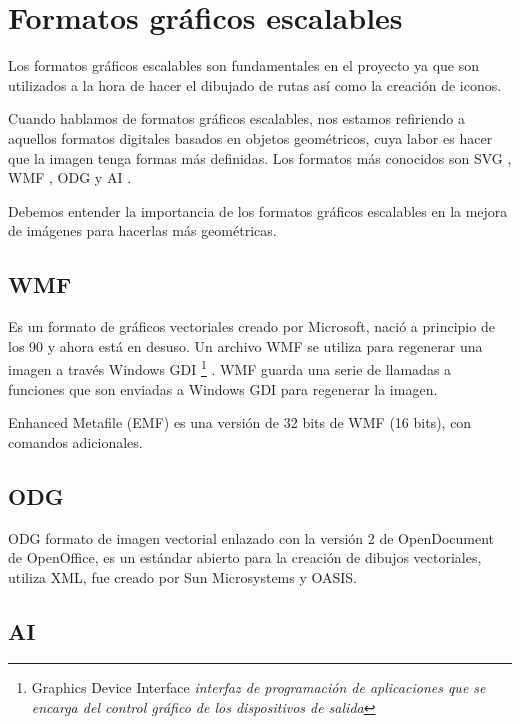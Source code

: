 \section{Formatos gráficos escalables}\label{formatos-graficos-escalables}

Los formatos gráficos escalables son fundamentales en el proyecto ya que son utilizados a la hora de hacer el dibujado de rutas así como la creación de iconos.

Cuando hablamos de formatos gráficos escalables, nos estamos refiriendo a aquellos formatos digitales basados en objetos geométricos, cuya labor es hacer que la imagen tenga formas m\'{a}s definidas.
Los formatos más conocidos son SVG \cite{noauthorcursonodate:a}, WMF \cite{noauthor_metaarchivo_2016:a}, ODG \cite{noauthor_definicion_nodate:c} y AI \cite{noauthorextensionnodate:b}.

Debemos entender la importancia de los formatos gráficos escalables en la mejora de imágenes para hacerlas más geométricas.


\subsection{WMF}\label{wmf}

Es un formato de gráficos vectoriales creado por Microsoft, nació a principio de los 90 y ahora está en desuso. Un archivo WMF se utiliza para regenerar una imagen a través Windows GDI \footnote{Graphics Device Interface \textit{interfaz de programación de aplicaciones que se encarga del control gráfico de los dispositivos de salida}} \hypertarget{_Hlk482387012}{. WMF guarda una serie de llamadas a funciones que son enviadas a Windows GDI para regenerar la imagen.}

Enhanced Metafile (EMF) es una versión de 32 bits de WMF (16 bits), con comandos adicionales.



\subsection{ODG}\label{ODG}


ODG formato de imagen vectorial enlazado con la versión 2 de OpenDocument de OpenOffice, es un estándar abierto para la creación de dibujos vectoriales, utiliza XML, fue creado por Sun Microsystems y OASIS.





\subsection{AI}\label{ai}

